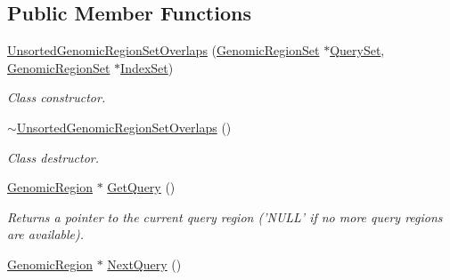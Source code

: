 \subsection*{Public Member Functions}
\begin{CompactItemize}
\item 
\hyperlink{classUnsortedGenomicRegionSetOverlaps_6a1255dfaac34080fae7880981b47acb}{UnsortedGenomicRegionSetOverlaps} (\hyperlink{classGenomicRegionSet}{GenomicRegionSet} $\ast$\hyperlink{classGenomicRegionSetOverlaps_e513304379055f6d379bc5907733dbe2}{QuerySet}, \hyperlink{classGenomicRegionSet}{GenomicRegionSet} $\ast$\hyperlink{classGenomicRegionSetOverlaps_c587bf854c827381493735b473622e03}{IndexSet})
\begin{CompactList}\small\item\em Class constructor. \item\end{CompactList}\item 
\hypertarget{classUnsortedGenomicRegionSetOverlaps_7682171bb52c651af44e4e8f3bf33f52}{
\hyperlink{classUnsortedGenomicRegionSetOverlaps_7682171bb52c651af44e4e8f3bf33f52}{$\sim$UnsortedGenomicRegionSetOverlaps} ()}
\label{classUnsortedGenomicRegionSetOverlaps_7682171bb52c651af44e4e8f3bf33f52}

\begin{CompactList}\small\item\em Class destructor. \item\end{CompactList}\item 
\hypertarget{classUnsortedGenomicRegionSetOverlaps_bf7e2f8d35f7a9cf8441caa9d765de44}{
\hyperlink{classGenomicRegion}{GenomicRegion} $\ast$ \hyperlink{classUnsortedGenomicRegionSetOverlaps_bf7e2f8d35f7a9cf8441caa9d765de44}{GetQuery} ()}
\label{classUnsortedGenomicRegionSetOverlaps_bf7e2f8d35f7a9cf8441caa9d765de44}

\begin{CompactList}\small\item\em Returns a pointer to the current query region ('NULL' if no more query regions are available). \item\end{CompactList}\item 
\hypertarget{classUnsortedGenomicRegionSetOverlaps_96e68ef99a958665f5da74572edcc854}{
\hyperlink{classGenomicRegion}{GenomicRegion} $\ast$ \hyperlink{classUnsortedGenomicRegionSetOverlaps_96e68ef99a958665f5da74572edcc854}{NextQuery} ()}
\label{classUnsortedGenomicRegionSetOverlaps_96e68ef99a958665f5da74572edcc854}


\end{CompactItemize}
